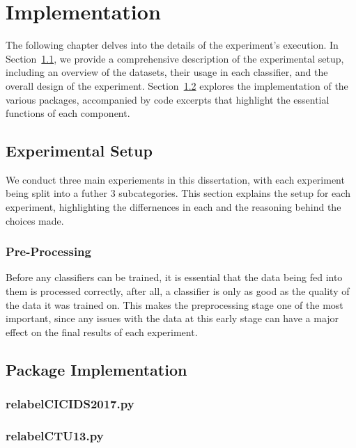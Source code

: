 \chapter{Implementation}

The following chapter delves into the details of the experiment's execution. In Section~\ref{sec:experimental-setup}, we provide a comprehensive description of the experimental setup, including an overview of the datasets, their usage in each classifier, and the overall design of the experiment. Section~\ref{sec:package-implementation} explores the implementation of the various packages, accompanied by code excerpts that highlight the essential functions of each component.

\section{Experimental Setup}\label{sec:experimental-setup}

We conduct three main experiements in this dissertation, with each experiment being split into a futher 3 subcategories. This section explains the setup for each experiment, highlighting the differnences in each and the reasoning behind the choices made.

\subsection{Pre-Processing}\label{subsec:pre-processing}

Before any classifiers can be trained, it is essential that the data being fed into them is processed correctly, after all, a classifier is only as good as the quality of the data it was trained on. This makes the preprocessing stage one of the most important, since any issues with the data at this early stage can have a major effect on the final results of each experiment.





\section{Package Implementation}\label{sec:package-implementation}

\subsection{relabelCICIDS2017.py}\label{subsec:relabelCICIDS2017.py}

\subsection{relabelCTU13.py}\label{subsec:relabelCTU13.py}